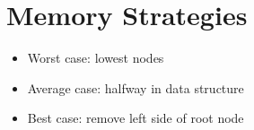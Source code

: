 \section{Memory Strategies}


\begin{itemize}
  \item Worst case:   lowest nodes
  \item Average case: halfway in data structure
  \item Best case:    remove left side of root node
\end{itemize}